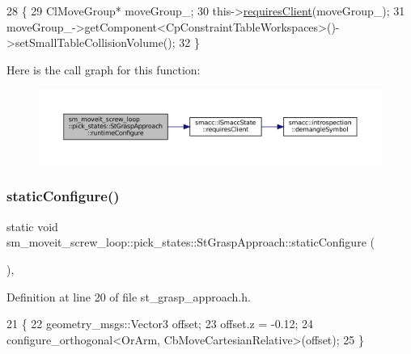 \begin{DoxyCode}
28     \{
29         ClMoveGroup* moveGroup\_;
30         this->\hyperlink{classsmacc_1_1ISmaccState_a7f95c9f0a6ea2d6f18d1aec0519de4ac}{requiresClient}(moveGroup\_);
31         moveGroup\_->getComponent<CpConstraintTableWorkspaces>()->setSmallTableCollisionVolume();
32     \}
\end{DoxyCode}
Here is the call graph for this function\+:
\nopagebreak
\begin{figure}[H]
\begin{center}
\leavevmode
\includegraphics[width=350pt]{structsm__moveit__screw__loop_1_1pick__states_1_1StGraspApproach_a7af3cb75f9eafbc21f2cb78ed73dba84_cgraph}
\end{center}
\end{figure}
\mbox{\label{structsm__moveit__screw__loop_1_1pick__states_1_1StGraspApproach_a9c32107457921df9c21d8fd073e69a36}} 
\subsubsection{\texorpdfstring{static\+Configure()}{staticConfigure()}}
{\footnotesize\ttfamily static void sm\+\_\+moveit\+\_\+screw\+\_\+loop\+::pick\+\_\+states\+::\+St\+Grasp\+Approach\+::static\+Configure (\begin{DoxyParamCaption}{ }\end{DoxyParamCaption})\hspace{0.3cm}{\ttfamily [inline]}, {\ttfamily [static]}}



Definition at line 20 of file st\+\_\+grasp\+\_\+approach.\+h.


\begin{DoxyCode}
21     \{
22         geometry\_msgs::Vector3 offset;
23         offset.z = -0.12;
24         configure\_orthogonal<OrArm, CbMoveCartesianRelative>(offset);
25     \}
\end{DoxyCode}


